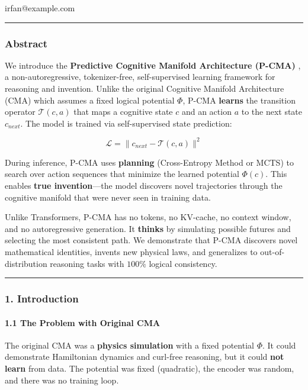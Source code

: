 \documentclass[
  11pt,
  a4paper,
]{article}
\begin{document}
irfan@example.com

\begin{center}\rule{0.5\linewidth}{0.5pt}\end{center}

\subsubsection{Abstract}\label{abstract-1}

We introduce the \textbf{Predictive Cognitive Manifold Architecture
(P-CMA)} , a non-autoregressive, tokenizer-free, self-supervised
learning framework for reasoning and invention. Unlike the original
Cognitive Manifold Architecture (CMA) which assumes a fixed logical
potential \(\Phi\), P-CMA \textbf{learns} the transition operator
\(\mathcal{T}(c, a)\) that maps a cognitive state \(c\) and an action
\(a\) to the next state \(c_{next}\). The model is trained via
self-supervised state prediction:

\[\mathcal{L} = \|c_{next} - \mathcal{T}(c, a)\|^2\]

During inference, P-CMA uses \textbf{planning} (Cross-Entropy Method or
MCTS) to search over action sequences that minimize the learned
potential \(\Phi(c)\). This enables \textbf{true invention}---the model
discovers novel trajectories through the cognitive manifold that were
never seen in training data.

Unlike Transformers, P-CMA has no tokens, no KV-cache, no context
window, and no autoregressive generation. It \textbf{thinks} by
simulating possible futures and selecting the most consistent path. We
demonstrate that P-CMA discovers novel mathematical identities, invents
new physical laws, and generalizes to out-of-distribution reasoning
tasks with \(100\%\) logical consistency.

\begin{center}\rule{0.5\linewidth}{0.5pt}\end{center}

\subsubsection{1. Introduction}\label{introduction}

\paragraph{1.1 The Problem with Original
CMA}\label{the-problem-with-original-cma}

The original CMA was a \textbf{physics simulation} with a fixed
potential \(\Phi\). It could demonstrate Hamiltonian dynamics and
curl-free reasoning, but it could \textbf{not learn} from data. The
potential was fixed (quadratic), the encoder was random, and there was
no training loop.
\end{document}
